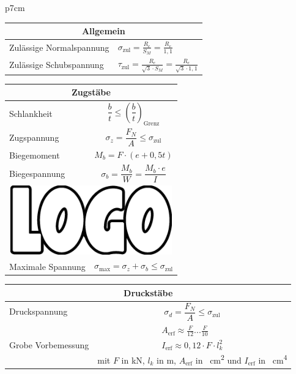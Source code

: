 \documentclass[11pt,a4paper,twocolumn]{scrartcl}
\newcommand{\ceins}{2.5cm}
\newcommand{\czwei}{5cm}
\newcommand{\cges}{7cm}
\begin{document}
\renewcommand{\arraystretch}{1.1}	
\begin{tabular}{p{\cges}}
	\arrayrulecolor{blue}
	\begin{tabular}{|p{\ceins}|p{\czwei}|}
	\multicolumn{2}{c}{\textbf{\Large Allgemein}}\\\hline
	Zulässige Normalspannung&$\sigma_{\text{zul}}=\frac{R_e}{S_M}=\frac{R_e}{1,1}$\\\hline
	Zulässige Schubspannung&$\tau_{\text{zul}}=\frac{R_e}{\sqrt{3}\cdot S_M}=\frac{R_e}{\sqrt{3}\cdot 1,1}$\\\hline
\end{tabular}
\begin{tabular}{|p{\ceins}|p{\czwei}|}
	\multicolumn{2}{c}{\textbf{\Large Zugstäbe}}\\\hline
	Schlankheit&$$\frac{b}{t}\leq\left(\frac{b}{t}\right)_{\text{Grenz}}$$\\\hline
	Zugspannung&$$\sigma_z=\frac{F_N}{A}\leq\sigma_{\text{zul}}$$\\\hline
	Biegemoment&$$ M_b=F\cdot (e+0,5t)$$\\\hline
	Biegespannung&$$ \sigma_b=\frac{M_b}{W}=\frac{M_b\cdot e}{I}$$\\\hline
	\multicolumn{2}{|c|}{\includegraphics[width=\cges]{logo}}\\\hline
	Maximale Spannung&$$ \sigma_{\text{max}}=\sigma_z+\sigma_b\leq \sigma_{\text{zul}}$$\\\hline
\end{tabular}
\begin{tabular}{|p{\ceins}|p{\czwei}|}
	\multicolumn{2}{c}{\textbf{\Large Druckstäbe}}\\\hline
	Druckspannung&$$\sigma_d=\frac{F_N}{A}\leq\sigma_{\text{zul}}$$\\\hline
	Grobe Vorbemessung&\begin{gather*}A_{\text{erf}}\approx\frac{F}{12}...\frac{F}{10}\\ I_{\text{erf}}\approx 0,12\cdot F\cdot l_k^2\end{gather*} mit $F$ in kN, $l_k$ in m, $A_{\text{erf}}$ in \SI{}{cm^2} und $I_{\text{erf}}$ in \SI{}{cm^4}	\\\hline
\end{tabular}
\end{tabular}
\end{document}
